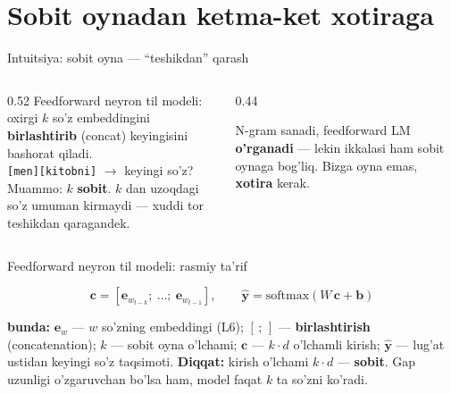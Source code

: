 \documentclass[aspectratio=169,11pt]{beamer}
\newcommand{\bunda}[1]{{\small\textbf{bunda:}\; #1}}
\begin{document}
\section[Neyron LM]{Sobit oynadan ketma-ket xotiraga}

\begin{frame}{Intuitsiya: sobit oyna --- ``teshikdan'' qarash}
  \begin{columns}[T]
    \begin{column}{0.52\textwidth}
      \small
      Feedforward neyron til modeli: oxirgi $k$ so'z embeddingini
      \textbf{birlashtirib} (concat) keyingisini bashorat qiladi.\\[6pt]
      \texttt{[men][kitobni]} $\to$ keyingi so'z?\\[6pt]
      Muammo: $k$ \textbf{sobit}. $k$ dan uzoqdagi so'z umuman kirmaydi ---
      xuddi tor teshikdan qaragandek.
    \end{column}
    \begin{column}{0.44\textwidth}
      \begin{tcolorbox}[okbox,top=2pt,bottom=2pt]
        \footnotesize
        N-gram sanadi, feedforward LM \textbf{o'rganadi} --- lekin ikkalasi ham
        sobit oynaga bog'liq. Bizga oyna emas, \textbf{xotira} kerak.
      \end{tcolorbox}
    \end{column}
  \end{columns}
\end{frame}

\begin{frame}{Feedforward neyron til modeli: rasmiy ta'rif}
  \begin{tcolorbox}[defbox,title=Ta'rif: sobit-oynali neyron LM]
    \vspace{-0.4em}
    $$ \mathbf{c} = [\mathbf{e}_{w_{t-k}};\ \ldots;\ \mathbf{e}_{w_{t-1}}], \qquad
       \hat{\mathbf{y}} = \mathrm{softmax}(W\,\mathbf{c}+\mathbf{b}) $$
  \end{tcolorbox}
  \vspace{3pt}
  \bunda{$\mathbf{e}_{w}$ --- $w$ so'zning embeddingi (L6); $[\,;\,]$ ---
  \textbf{birlashtirish} (concatenation); $k$ --- sobit oyna o'lchami;
  $\mathbf{c}$ --- $k\cdot d$ o'lchamli kirish; $\hat{\mathbf{y}}$ --- lug'at
  ustidan keyingi so'z taqsimoti.}
  \vspace{5pt}
  \textbf{Diqqat:} kirish o'lchami $k\cdot d$ --- \textbf{sobit}. Gap uzunligi
  o'zgaruvchan bo'lsa ham, model faqat $k$ ta so'zni ko'radi.
\end{frame}
\end{document}
